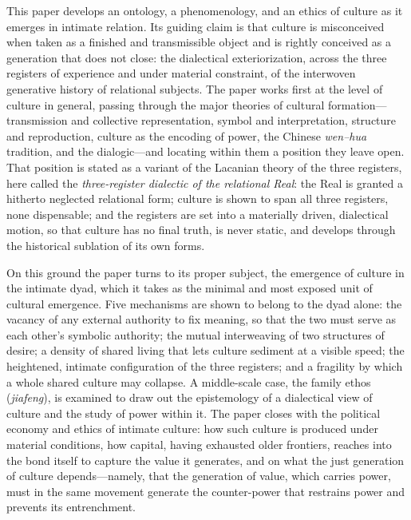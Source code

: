 This paper develops an ontology, a phenomenology, and an ethics of culture as it emerges in intimate relation. Its guiding claim is that culture is misconceived when taken as a finished and transmissible object and is rightly conceived as a generation that does not close: the dialectical exteriorization, across the three registers of experience and under material constraint, of the interwoven generative history of relational subjects. The paper works first at the level of culture in general, passing through the major theories of cultural formation---transmission and collective representation, symbol and interpretation, structure and reproduction, culture as the encoding of power, the Chinese \emph{wen--hua} tradition, and the dialogic---and locating within them a position they leave open. That position is stated as a variant of the Lacanian theory of the three registers, here called the \emph{three-register dialectic of the relational Real}: the Real is granted a hitherto neglected relational form; culture is shown to span all three registers, none dispensable; and the registers are set into a materially driven, dialectical motion, so that culture has no final truth, is never static, and develops through the historical sublation of its own forms.

On this ground the paper turns to its proper subject, the emergence of culture in the intimate dyad, which it takes as the minimal and most exposed unit of cultural emergence. Five mechanisms are shown to belong to the dyad alone: the vacancy of any external authority to fix meaning, so that the two must serve as each other's symbolic authority; the mutual interweaving of two structures of desire; a density of shared living that lets culture sediment at a visible speed; the heightened, intimate configuration of the three registers; and a fragility by which a whole shared culture may collapse. A middle-scale case, the family ethos (\emph{jiafeng}), is examined to draw out the epistemology of a dialectical view of culture and the study of power within it. The paper closes with the political economy and ethics of intimate culture: how such culture is produced under material conditions, how capital, having exhausted older frontiers, reaches into the bond itself to capture the value it generates, and on what the just generation of culture depends---namely, that the generation of value, which carries power, must in the same movement generate the counter-power that restrains power and prevents its entrenchment.

